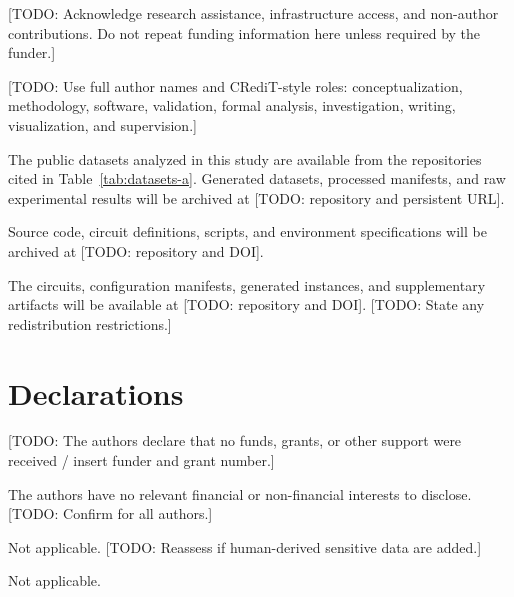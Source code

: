 \documentclass[pdflatex,sn-mathphys-num,iicol]{sn-jnl}
\newcommand{\placeholder}[1]{\textcolor{red!75!black}{[TODO:\allowbreak{} #1]}}
\theoremstyle{plain}
\theoremstyle{definition}
\theoremstyle{remark}
\begin{document}
\placeholder{Acknowledge research assistance, infrastructure access, and non-author contributions. Do not repeat funding information here unless required by the funder.}

\placeholder{Use full author names and CRediT-style roles: conceptualization, methodology, software, validation, formal analysis, investigation, writing, visualization, and supervision.}

The public datasets analyzed in this study are available from the repositories cited in Table~\ref{tab:datasets-a}. Generated datasets, processed manifests, and raw experimental results will be archived at \placeholder{repository and persistent URL}.

Source code, circuit definitions, scripts, and environment specifications will be archived at \placeholder{repository and DOI}.

The circuits, configuration manifests, generated instances, and supplementary artifacts will be available at \placeholder{repository and DOI}. \placeholder{State any redistribution restrictions.}

\section*{Declarations}
\placeholder{The authors declare that no funds, grants, or other support were received / insert funder and grant number.}

The authors have no relevant financial or non-financial interests to disclose. \placeholder{Confirm for all authors.}

Not applicable. \placeholder{Reassess if human-derived sensitive data are added.}

Not applicable.



\end{document}
